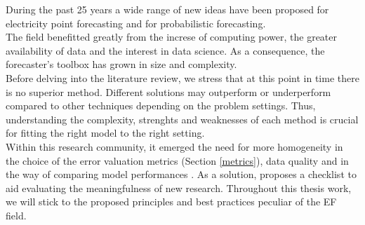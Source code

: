 During the past 25 years %
a wide range of new ideas have been proposed for electricity point forecasting and for probabilistic forecasting.
\\
The field benefitted greatly from the increse of computing power, the greater availability of data and the interest in data science.
As a consequence, the forecaster's toolbox has grown in size and complexity.
\\
Before delving into the literature review, we stress that at this point in time there is no superior method. Different solutions may outperform or underperform compared to other techniques depending on the problem settings. Thus, understanding the complexity, strenghts and weaknesses of each method is crucial for fitting the right model to the right setting.
\\
Within this research community, it emerged the need for more homogeneity in the choice of the error valuation metrics (Section \ref{metrics}), data quality and in the way of comparing model performances \cite{EPF_review}. As a solution, \cite{lago} proposes a checklist to aid evaluating the meaningfulness of new research. Throughout this thesis work, we will stick to the proposed principles and best practices peculiar of the EF field.

